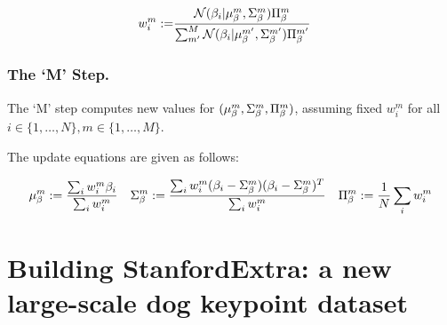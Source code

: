 \begin{align}
    w_{i}^{m} 
    :=& 
    \frac{
        \mathcal{N}(\beta_{i} | \mu_{\beta}^{m},\Sigma_{\beta}^{m})\Pi_{\beta}^{m}
    }
    {
        \sum_{m'}^{M}
        \mathcal{N}(\beta_{i} | \mu_{\beta}^{m'},\Sigma_{\beta}^{m'})\Pi_{\beta}^{m'}
    }
\end{align}



\subsubsection{The `M' Step.}
The `M' step computes new values for $(\mu_{\beta}^{m}, \Sigma_{\beta}^{m}, \Pi_{\beta}^{m})$, assuming fixed $w_{i}^{m}$ for all $i \in \{1,\dots,N\}, m \in \{1,\dots,M\}$.

The update equations are given as follows:



\begin{equation}
    \mu_{\beta}^{m} := 
    \frac{
        \sum_{i}w_{i}^{m}\beta_{i}
    }
    {
        \sum_{i}w_{i}^{m}
    }
    \quad
    \Sigma_{\beta}^{m} :=
    \frac{
        \sum_{i}w_{i}^{m}
        (\beta_{i} - \Sigma_{\beta}^{m})
        (\beta_{i} - \Sigma_{\beta}^{m})^{T}
    }
    {
        \sum_{i}w_{i}^{m}
    }
    \quad
    \Pi_{\beta}^{m} :=
    \frac{1}{N}\sum_{i}{w_{i}^{m}}
\end{equation}

\section{Building StanfordExtra: a new large-scale dog keypoint dataset}

